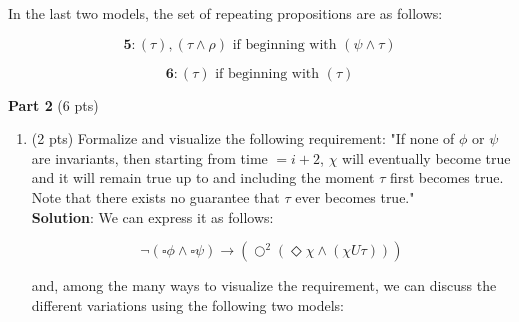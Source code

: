 \documentclass[12pt]{article}
\begin{document}
\begin{spacing}{1.5}
\begin{enumerate}
		      In the last two models, the set of repeating propositions are as follows:
		      		      		      		      
		      $$\textbf{5}: (\tau), (\tau \land \rho) \text{ if beginning with } (\psi \land \tau)$$
		      		      		      		      
		      $$\textbf{6}: (\tau) \text{ if beginning with } (\tau)$$
		      		      		      		      		              
	\end{enumerate}
				
	\textbf{Part 2} (6 pts)
				
	\begin{enumerate}
		\item (2 pts) Formalize and visualize the following requirement: "If none of $\phi$ or $\psi$ are invariants, then starting from time $=i+2$, $\chi$ will eventually become true and it will remain true up to and including the moment $\tau$ first becomes true. Note that there exists no guarantee that $\tau$ ever becomes true."\\
		      		      		      		      
		      \textbf{Solution}: We can express it as follows:
		      		      		      		      
		      $$\neg(\square \phi \land \square \psi)\rightarrow (\bigcirc^2 (\Diamond \chi \land (\chi U \tau)))$$
		      		      		      		      
		      and, among the many ways to visualize the requirement, we can discuss the different variations using the following two models:
		      		      		      		              
		      \begin{center}
\end{center}
\end{enumerate}
\end{spacing}
\end{document}
